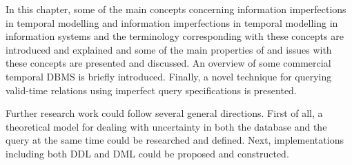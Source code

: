 In this chapter, some of the main concepts concerning information imperfections in temporal modelling and information imperfections in temporal modelling in information systems and the terminology corresponding with these concepts are introduced and explained and some of the main properties of and issues with these concepts are presented and discussed. An overview of some commercial temporal DBMS is briefly introduced. Finally, a novel technique for querying valid-time relations using imperfect query specifications is presented.



Further research work could follow several general directions. First of all, a theoretical model for dealing with uncertainty in both the database and the query at the same time could be researched and defined. Next, implementations including both DDL and DML could be proposed and constructed.

